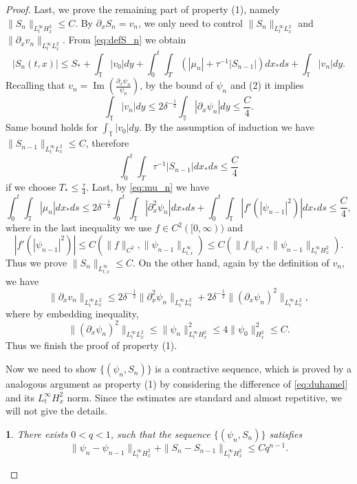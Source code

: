 \documentclass[leqno]{amsart}
\theoremstyle{plain}
\theoremstyle{definition}
\theoremstyle{remark}
\theoremstyle{plain}
\newtheorem{lem}[thm]{\protect\lemmaname}
\theoremstyle{plain}
\providecommand{\lemmaname}{Lemma}
\def\T{{\mathbb T}}%
\def\d{{\partial}}
\DeclareMathOperator{\IM}{Im}
\numberwithin{equation}{section}
\begin{document}
\begin{proof}
Last, we prove the remaining part of property (1), namely $\|S_n\|_{L^\infty_tH^2_x}\leq C$. By $\d_xS_n=v_n$, we only need to control $\|S_n\|_{L^\infty_tL^2_x}$ and $\|\d_x v_n\|_{L^\infty_tL^2_x}$.
From \eqref{eq:defS_n} we obtain
\[
|S_n(t,x)|\leq S_*+ \int_\T|v_0|dy+\int_0^t\int_T(|\mu_n|+\tau^{-1}|S_{n-1}|)dx_*ds+\int_\T|v_n|dy.
\]
Recalling that $v_n=\IM(\frac{\d_x\psi_n}{\psi_n})$, by the bound of $\psi_n$ and (2) it implies
\[
\int_\T|v_n|dy\leq 2\delta^{-\frac12}\int_\T |\d_x\psi_n|dy\leq \frac{C}{4}.
\]
Same bound holds for $\int_\T|v_0|dy$. By the assumption of induction we have $\|S_{n-1}\|_{L^\infty_tL^2_x}\leq C$, therefore
\[
\int_0^t\int_T\tau^{-1}|S_{n-1}|dx_*ds\leq \frac{C}{4}
\]
if we choose $T_*\leq \frac{\tau}{4}$. Last, by \eqref{eq:mu_n} we have
\[
\int_0^t\int_\T|\mu_n|dx_*ds\leq 2\delta^{-\frac12}\int_0^t\int_\T|\d_x^2\psi_n|dx_*ds+\int_0^t\int_\T|f'(|\psi_{n-1}|^2)|dx_*ds\leq \frac{C}{4},
\]
where in the last inequality we use $f\in C^2([0,\infty))$ and 
\[
|f'(|\psi_{n-1}|^2)|\leq C(\|f\|_{C^2},\|\psi_{n-1}\|_{L^\infty_{t,x}})\leq C(\|f\|_{C^2},\|\psi_{n-1}\|_{L^\infty_{t}H^2_x}).
\]
Thus we prove $\|S_n\|_{L^\infty_{t,x}}\leq C$. On the other hand, again by the definition of $v_n$, we have
\[
\|\d_xv_n\|_{L_t^\infty L^2_x}\leq 2\delta^{-\frac12}\|\d_x^2\psi_n\|_{L_t^\infty L^2_x}+2\delta^{-\frac12}\|(\d_x\psi_n)^2\|_{L_t^\infty L^2_x},
\]
where by embedding inequality,
\[
\|(\d_x\psi_n)^2\|_{L_t^\infty L^2_x}\leq \|\psi_n\|_{L_t^\infty H^2_x}^2\leq 4\|\psi_0\|_{H^2_x}^2\leq C.
\]
Thus we finish the proof of property (1).

Now we need to show $\{(\psi_n,S_n)\}$ is a contractive sequence, which is proved by a analogous argument as property (1) by considering the difference of \eqref{eq:duhamel} and its $L^\infty_tH^2_x$ norm. Since the estimates are standard and almost repetitive, we will not give the details.

\begin{lem}\label{lem:contr}
There exists $0<q<1$, such that the sequence $\{(\psi_n,S_n)\}$ satisfies
\[
\|\psi_n-\psi_{n-1}\|_{L^\infty_tH^2_x}+\|S_{n}-S_{n-1}\|_{L^\infty_tH^2_x}\leq Cq^{n-1}.
\]
\end{lem}


\end{proof}
\end{document}
